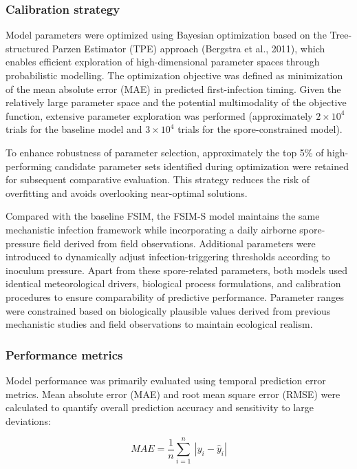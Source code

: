 \documentclass[
]{article}
\begin{document}
\subsubsection{Calibration strategy}\label{calibration-strategy}

Model parameters were optimized using Bayesian optimization based on the
Tree-structured Parzen Estimator (TPE) approach (Bergstra et al., 2011),
which enables efficient exploration of high-dimensional parameter spaces
through probabilistic modelling. The optimization objective was defined
as minimization of the mean absolute error (MAE) in predicted
first-infection timing. Given the relatively large parameter space and
the potential multimodality of the objective function, extensive
parameter exploration was performed (approximately \(2 \times 10^{4}\)
trials for the baseline model and \(3 \times 10^{4}\) trials for the
spore-constrained model).

To enhance robustness of parameter selection, approximately the top 5\%
of high-performing candidate parameter sets identified during
optimization were retained for subsequent comparative evaluation. This
strategy reduces the risk of overfitting and avoids overlooking
near-optimal solutions.

Compared with the baseline FSIM, the FSIM-S model maintains the same
mechanistic infection framework while incorporating a daily airborne
spore-pressure field derived from field observations. Additional
parameters were introduced to dynamically adjust infection-triggering
thresholds according to inoculum pressure. Apart from these
spore-related parameters, both models used identical meteorological
drivers, biological process formulations, and calibration procedures to
ensure comparability of predictive performance. Parameter ranges were
constrained based on biologically plausible values derived from previous
mechanistic studies and field observations to maintain ecological
realism.

\subsubsection{Performance metrics}\label{performance-metrics}

Model performance was primarily evaluated using temporal prediction
error metrics. Mean absolute error (MAE) and root mean square error
(RMSE) were calculated to quantify overall prediction accuracy and
sensitivity to large deviations:

\begin{equation}
MAE = \frac{1}{n}\sum_{i = 1}^{n}\mspace{2mu}\mspace{2mu}\left| y_{i} - {\widehat{y}}_{i} \right|
\tag{12}
\end{equation}
\end{document}
